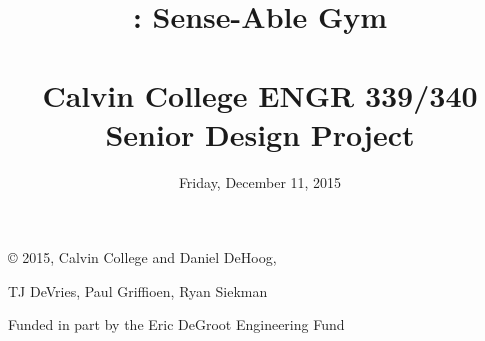 \documentclass{article}
\title{
\vspace{2in}
\textmd{\textbf{\TeamName: Sense-Able Gym}}\\
\textmd{\textbf\DocTitle}\\
\vspace{0.1in}\large{Calvin College ENGR 339/340 Senior Design Project}
\vspace{3in}
}
\author{\textbf{\DocAuthorName}}
\date{Friday, December 11, 2015} %
\begin{document}
\maketitle{}
\thispagestyle{empty} %



\newpage
\vspace*{\fill}
\centerline{\copyright{} 2015, Calvin College and Daniel DeHoog,}
\centerline{TJ DeVries, Paul Griffioen, Ryan Siekman}
\centerline{}
\centerline{Funded in part by the Eric DeGroot Engineering Fund}
\vspace*{\fill}


\newpage




\newpage
\tableofcontents

\newpage


\newpage


\newpage






















\newpage


\end{document}
